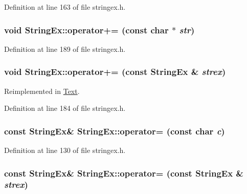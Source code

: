 Definition at line 163 of file stringex.h.\hypertarget{classStringEx_0ca4d6a67738b3e442789ab2047742a1}{
\subsubsection[{operator+=}]{\setlength{\rightskip}{0pt plus 5cm}void StringEx::operator+= (const char $\ast$ {\em str})}}
\label{classStringEx_0ca4d6a67738b3e442789ab2047742a1}




Definition at line 189 of file stringex.h.\hypertarget{classStringEx_08601f0088a4c472e9485243e03fca16}{
\subsubsection[{operator+=}]{\setlength{\rightskip}{0pt plus 5cm}void StringEx::operator+= (const {\bf StringEx} \& {\em strex})}}
\label{classStringEx_08601f0088a4c472e9485243e03fca16}




Reimplemented in \hyperlink{classText_326e20a30f0362bd9c84cb61a065e9d0}{Text}.

Definition at line 184 of file stringex.h.\hypertarget{classStringEx_e6556e9e33cf433bc5ce65c2cc709907}{
\subsubsection[{operator=}]{\setlength{\rightskip}{0pt plus 5cm}const {\bf StringEx}\& StringEx::operator= (const char {\em c})}}
\label{classStringEx_e6556e9e33cf433bc5ce65c2cc709907}




Definition at line 130 of file stringex.h.\hypertarget{classStringEx_1071b3e23def59810d2a7d97a134cd72}{
\subsubsection[{operator=}]{\setlength{\rightskip}{0pt plus 5cm}const {\bf StringEx}\& StringEx::operator= (const {\bf StringEx} \& {\em strex})}}
\label{classStringEx_1071b3e23def59810d2a7d97a134cd72}




